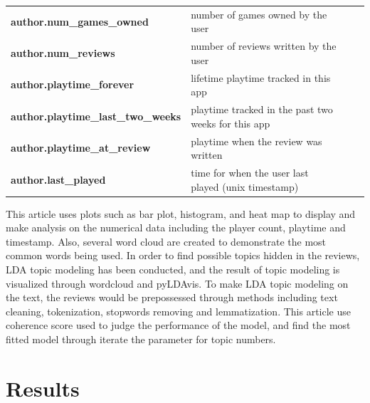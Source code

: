 \documentclass[12pt]{article}
\begin{document}
\begin{table}[H]
\begin{tabular}{lp{}lp{}}
    \textbf{author.num\_games\_owned}                                                                      & number of games owned by the user                                      \\[+3pt]
    \textbf{author.num\_reviews}                                                                           & number of reviews written by the user                                  \\[+3pt]
    \textbf{author.playtime\_forever}                                                                      & lifetime playtime tracked in this app                                  \\[+3pt]
    \textbf{author.playtime\_last\_two\_weeks}                                                             & playtime tracked in the past two weeks for this app                    \\[+3pt]
    \textbf{author.playtime\_at\_review}                                                                   & playtime when the review was written                                   \\[+3pt]
    \textbf{author.last\_played}                                                                           & time for when the user last played (unix timestamp)                    \\
    \bottomrule
    \end{tabular}
    \label{Tab:API}
\end{table}

This article uses plots such as bar plot, histogram, and heat map to display and make analysis on the numerical data including the player count, playtime and timestamp. Also, several word cloud are created to demonstrate the most common words being used. In order to find possible topics hidden in the reviews, LDA topic modeling has been conducted, and the result of topic modeling is visualized through wordcloud and pyLDAvis. To make LDA topic modeling on the text, the reviews would be prepossessed through methods including text cleaning, tokenization, stopwords removing and lemmatization. This article use coherence score used to judge the performance of the model, and find the most fitted model through iterate the parameter for topic numbers.

\section{Results}
\end{document}
